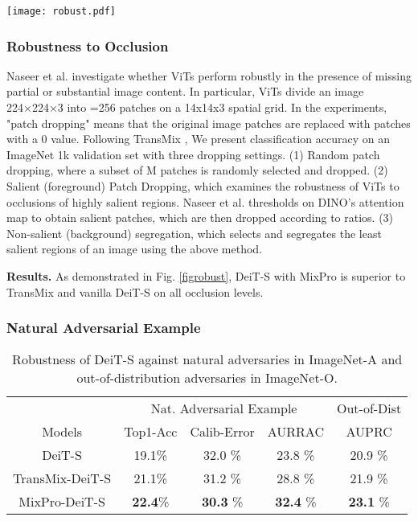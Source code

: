 \documentclass{article} \usepackage{iclr2023_conference,times}
\begin{document}
\begin{figure*}[!htb]
\centering
\texttt{[image: robust.pdf]}
\caption{Robustness against occlusion. The figure shows the robustness of DeiT-S against occlusion with different information loss ratios.}

\label{figrobust}
\end{figure*}
\subsubsection{Robustness to Occlusion} Naseer et al. \citep{naseer2021intriguing} investigate whether ViTs perform robustly in the presence of missing partial or substantial image content. In particular, ViTs divide an image 224×224×3 into  =256 patches on a 14x14x3 spatial grid. In the experiments, "patch dropping" means that the original image patches are replaced with patches with a 0 value. Following TransMix \citep{chen2021transmix}, We present classification accuracy on an ImageNet 1k validation set with three dropping settings. (1) Random patch dropping, where a subset of M patches is randomly selected and dropped. (2) Salient (foreground) Patch Dropping, which examines the robustness of ViTs to occlusions of highly salient regions. Naseer et al. \citep{naseer2021intriguing} thresholds on DINO's attention map to obtain salient patches, which are then dropped according to ratios. (3) Non-salient (background) segregation, which selects and segregates the least salient regions of an image using the above method.

\textbf{Results.} As demonstrated in Fig. \ref{figrobust}, DeiT-S with MixPro is superior to TransMix and vanilla DeiT-S on all occlusion levels.

\subsubsection{Natural Adversarial Example}
\begin{table}[!htb]
\caption{Robustness of DeiT-S against natural adversaries in ImageNet-A and out-of-distribution adversaries in ImageNet-O.}
\label{tabNat}
	\centering
	\begin{tabular}{ccccc}
    \toprule
      ~ & \multicolumn{3}{c}{Nat. Adversarial Example}  & Out-of-Dist \\
        Models &  Top1-Acc   &  Calib-Error  & AURRAC & AUPRC\\
    \midrule
     DeiT-S &19.1\% &32.0 \% & 23.8 \%& 20.9 \%    \\
     TransMix-DeiT-S &21.1\% &31.2 \% & 28.8 \%& 21.9 \%    \\
     MixPro-DeiT-S &\textbf{22.4}\% &\textbf{30.3} \% & \textbf{32.4} \%& \textbf{23.1} \%    \\
  
    \bottomrule
\end{tabular}
\end{table}
\end{document}
